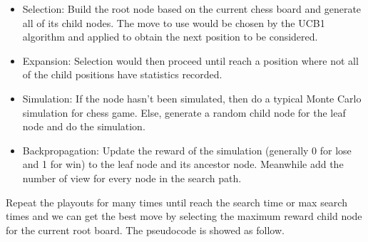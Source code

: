 \documentclass[11pt,a4paper]{article}
\begin{document}
\begin{itemize}
\item Selection:
Build the root node based on the current chess board and generate all of its child nodes. The move to use would be chosen by the UCB1 algorithm and applied to obtain the next position to be considered. 
\item Expansion:
Selection would then proceed until reach a position where not all of the child positions have statistics recorded. 
\item Simulation:
If the node hasn't been simulated, then do a typical Monte Carlo simulation for chess game. Else, generate a random child node for the leaf node and do the simulation.
\item Backpropagation:
Update the reward of the simulation (generally 0 for lose and 1 for win) to the leaf node and its ancestor node. Meanwhile add the number of view for every node in the search path.
\end{itemize}
\par Repeat the playouts for many times until reach the search time or max search times and we can get the best move by selecting the maximum reward child node for the current root board. The pseudocode is showed as follow.
\end{document}
